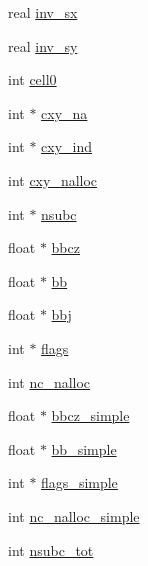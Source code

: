 \begin{DoxyCompactItemize}
\item 
real \hyperlink{structnbnxn__grid__t_ac3099e0749c1de9fec353034c6cc5f29}{inv\-\_\-sx}
\item 
real \hyperlink{structnbnxn__grid__t_afc812127ea5e66fefb39164042236ec0}{inv\-\_\-sy}
\item 
int \hyperlink{structnbnxn__grid__t_aaa1e13e04a6bb5e28e1d2172714ea6df}{cell0}
\item 
int $\ast$ \hyperlink{structnbnxn__grid__t_aa32b48c0c774658b9c7bf1de1a1c76dc}{cxy\-\_\-na}
\item 
int $\ast$ \hyperlink{structnbnxn__grid__t_a071932bf886e8c22b4bb1d783afb189e}{cxy\-\_\-ind}
\item 
int \hyperlink{structnbnxn__grid__t_a3d01296d1db867777cddd819b56409f6}{cxy\-\_\-nalloc}
\item 
int $\ast$ \hyperlink{structnbnxn__grid__t_a7c69e89ccc0c935a8739e542fd510ae9}{nsubc}
\item 
float $\ast$ \hyperlink{structnbnxn__grid__t_a86937697caf40f19c1e2a5c9e0aac826}{bbcz}
\item 
float $\ast$ \hyperlink{structnbnxn__grid__t_a1ed682e1e3b8362777fd7134c9d78ea4}{bb}
\item 
float $\ast$ \hyperlink{structnbnxn__grid__t_a79b170a15b879e9e779714b439a8f484}{bbj}
\item 
int $\ast$ \hyperlink{structnbnxn__grid__t_a5d46b0ac2a146fb512905430ea3820c2}{flags}
\item 
int \hyperlink{structnbnxn__grid__t_acc5e4a30ff6d10a5ef740afff866b9d0}{nc\-\_\-nalloc}
\item 
float $\ast$ \hyperlink{structnbnxn__grid__t_af8346fa8658b0756513f2a0af632b2c3}{bbcz\-\_\-simple}
\item 
float $\ast$ \hyperlink{structnbnxn__grid__t_a5ad792621e5d8bcc2c3e3145f7d09c1d}{bb\-\_\-simple}
\item 
int $\ast$ \hyperlink{structnbnxn__grid__t_a81d011e00c6c7b8d740ef7e75640832c}{flags\-\_\-simple}
\item 
int \hyperlink{structnbnxn__grid__t_ab26058c0258fbc5594ff1331179ffbcc}{nc\-\_\-nalloc\-\_\-simple}
\item 
int \hyperlink{structnbnxn__grid__t_ab1d8e7c066aa35966aa8114392232b9f}{nsubc\-\_\-tot}
\end{DoxyCompactItemize}


